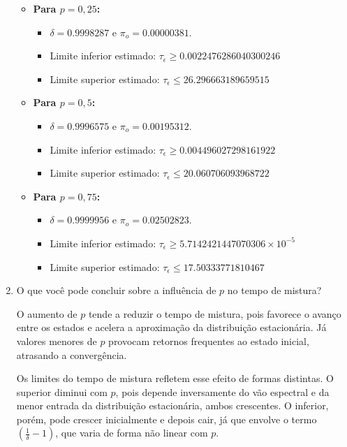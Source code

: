 \begin{enumerate}
\begin{resposta}
        \begin{itemize}
            \item \textbf{Para $p = 0{,}25$:}
            \begin{itemize}
                \item $\delta = 0.9998287$ e $\pi_o = 0.00000381$.
                \item Limite inferior estimado:
                $ \boxed{\tau_\epsilon \geq 0.0022476286040300246} $
                \item Limite superior estimado:
                $ \boxed{\tau_\epsilon \leq 26.296663189659515} $
            \end{itemize}
        
            \item \textbf{Para $p = 0{,}5$:}
            \begin{itemize}
                \item $\delta = 0.9996575$ e $\pi_o = 0.00195312$.
                \item Limite inferior estimado:
                $ \boxed{\tau_\epsilon \geq 0.004496027298161922} $
                \item Limite superior estimado:
                $ \boxed{\tau_\epsilon \leq 20.060706093968722} $
            \end{itemize}
        
            \item \textbf{Para $p = 0{,}75$:}
            \begin{itemize}
                \item $\delta = 0.9999956$ e $\pi_o = 0.02502823$.
                \item Limite inferior estimado:
                $ \boxed{\tau_\epsilon \geq 5.7142421447070306 \times 10^{-5}} $
                \item Limite superior estimado:
                $ \boxed{\tau_\epsilon \leq 17.50333771810467} $
            \end{itemize}
        \end{itemize}
    \end{resposta}

    \item O que você pode concluir sobre a influência de $p$ no tempo de mistura?
    \begin{resposta}
        O aumento de $p$ tende a reduzir o tempo de mistura, pois favorece o avanço entre os estados e acelera a aproximação da distribuição estacionária. Já valores menores de $p$ provocam retornos frequentes ao estado inicial, atrasando a convergência.

        Os limites do tempo de mistura refletem esse efeito de formas distintas. O superior diminui com $p$, pois depende inversamente do vão espectral e da menor entrada da distribuição estacionária, ambos crescentes. O inferior, porém, pode crescer inicialmente e depois cair, já que envolve o termo $\left( \frac{1}{\delta} - 1 \right)$, que varia de forma não linear com $p$.
    \end{resposta}
\end{enumerate}

